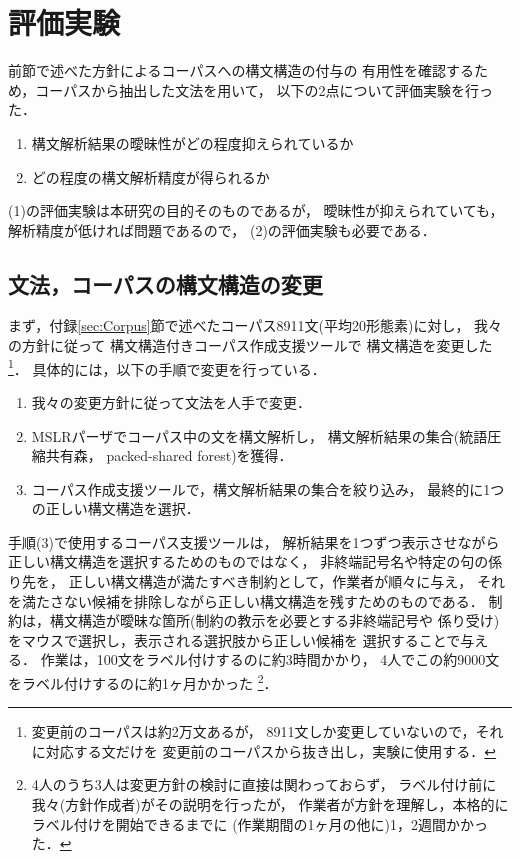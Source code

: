 \section{評価実験}
\label{sec:Evaluation}

前節で述べた方針によるコーパスへの構文構造の付与の
有用性を確認するため，コーパスから抽出した文法を用いて，
以下の2点について評価実験を行った．
\begin{enumerate}
\item 構文解析結果の曖昧性がどの程度抑えられているか
\item どの程度の構文解析精度が得られるか
\end{enumerate}
(1)の評価実験は本研究の目的そのものであるが，
曖昧性が抑えられていても，解析精度が低ければ問題であるので，
(2)の評価実験も必要である．

\subsection{文法，コーパスの構文構造の変更}

まず，付録\ref{sec:Corpus}節で述べたコーパス8911文(平均20形態素)に対し，
我々の方針に従って
構文構造付きコーパス作成支援ツール\cite{okazaki:2001}で
構文構造を変更した
\footnote{変更前のコーパスは約2万文あるが，
8911文しか変更していないので，それに対応する文だけを
変更前のコーパスから抜き出し，実験に使用する．}．
具体的には，以下の手順で変更を行っている．
\begin{enumerate}
\item 我々の変更方針に従って文法を人手で変更．
\item MSLRパーザ\cite{shirai:00}でコーパス中の文を構文解析し，
  構文解析結果の集合(統語圧縮共有森，
  packed-shared forest\cite{tomita:86})を獲得．
\item コーパス作成支援ツールで，構文解析結果の集合を絞り込み，
  最終的に1つの正しい構文構造を選択．
\end{enumerate}
手順(3)で使用するコーパス支援ツールは，
解析結果を1つずつ表示させながら正しい構文構造を選択するためのものではなく，
非終端記号名や特定の句の係り先を，
正しい構文構造が満たすべき制約として，作業者が順々に与え，
それを満たさない候補を排除しながら正しい構文構造を残すためのものである．
制約は，構文構造が曖昧な箇所(制約の教示を必要とする非終端記号や
係り受け)をマウスで選択し，表示される選択肢から正しい候補を
選択することで与える．
作業は，100文をラベル付けするのに約3時間かかり，
4人でこの約9000文をラベル付けするのに約1ヶ月かかった
\footnote{4人のうち3人は変更方針の検討に直接は関わっておらず，
ラベル付け前に我々(方針作成者)がその説明を行ったが，
作業者が方針を理解し，本格的にラベル付けを開始できるまでに
(作業期間の1ヶ月の他に)1，2週間かかった．}．

